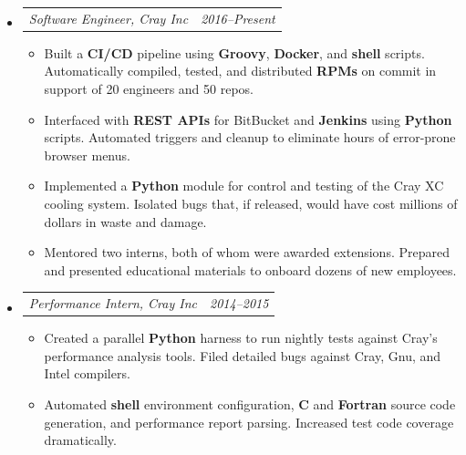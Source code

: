 \documentclass[12pt,letterpaper]{article}
\makeatletter
\newcommand{\headerpair}[2]{
    \begin{tabular*}{\linewidth}{l@{ \extracolsep{\fill} }r} {\large\emph{#1}} & {\large\emph{#2}}
    \end{tabular*}
}
\newcommand{\headerrow}[3]{\headerpair{#1, #2}{#3}}
\newcommand{\YearRange}[2]{#1--#2}
\newcommand{\CPP}{C\nolinebreak[4]\hspace{-.05em}\raisebox{.22ex}{\footnotesize\bf ++}\xspace}
\makeatother
\begin{document}
\begin{itemize}[leftmargin=\parindent]
    \parskip=0.1em
    \itemsep=1.2em
    \item[]
        \headerrow
            {Software Engineer}
            {Cray Inc}
            {\YearRange{2016}{Present}}
        \begin{itemize}[leftmargin=\parindent]
            \item Built a \textbf{CI/CD} pipeline using \textbf{Groovy}, \textbf{Docker}, and \textbf{shell} scripts. Automatically compiled, tested, and distributed \textbf{RPMs} on commit in support of 20 engineers and 50 repos.
            \item Interfaced with \textbf{REST APIs} for BitBucket and \textbf{Jenkins} using \textbf{Python} scripts. Automated triggers and cleanup to eliminate hours of error-prone browser menus.
            \item Implemented a \textbf{Python} module for control and testing of the Cray XC cooling system. Isolated bugs that, if released, would have cost millions of dollars in waste and damage.
            \item Mentored two interns, both of whom were awarded extensions. Prepared and presented educational materials to onboard dozens of new employees.
        \end{itemize}
    \item[]
        \headerrow
            {Performance Intern}
            {Cray Inc}
            {\YearRange{2014}{2015}}
        \begin{itemize}[leftmargin=\parindent]
            \item Created a parallel \textbf{Python} harness to run nightly tests against Cray's performance analysis tools. Filed detailed bugs against Cray, Gnu, and Intel compilers.
            \item Automated \textbf{shell} environment configuration, \textbf{\CPP} and \textbf{Fortran} source code generation, and performance report parsing. Increased test code coverage dramatically.

\end{itemize}
\end{itemize}
\end{document}
